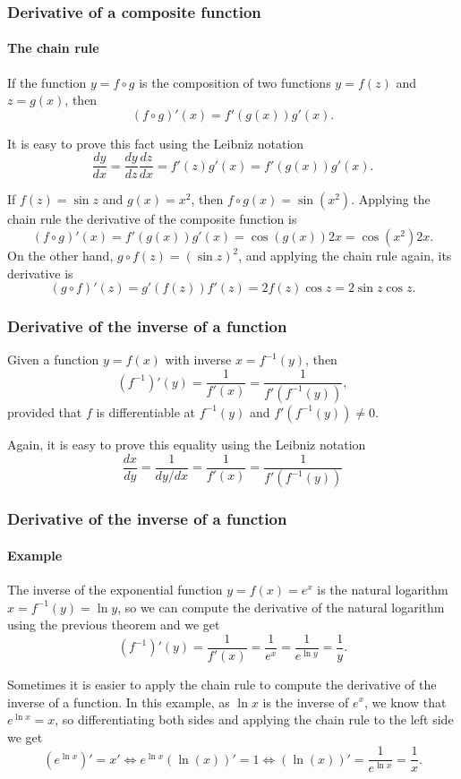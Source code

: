 \begin{frame}
\frametitle{Derivative of a composite function}
\framesubtitle{The chain rule}
\begin{theorem} If the function $y=f\circ g$ is the composition of two functions $y=f(z)$ and $z=g(x)$, then
\[ 
(f\circ g)'(x)=f'(g(x))g'(x).
\]
\end{theorem}

It is easy to prove this fact using the Leibniz notation
\[
\frac{dy}{dx}=\frac{dy}{dz}\frac{dz}{dx}=f'(z)g'(x)=f'(g(x))g'(x).
\]

 If $f(z)=\sin z$ and $g(x)=x^2$, then $f\circ g(x)=\sin(x^2)$. Applying the chain rule the derivative of the composite function is
\[
(f\circ g)'(x)=f'(g(x))g'(x) = \cos(g(x)) 2x = \cos(x^2)2x.
\]
On the other hand, $g\circ f(z)= (\sin z)^2$, and applying the chain rule again, its derivative is
\[
(g\circ f)'(z)=g'(f(z))f'(z) = 2f(z)\cos z = 2\sin z\cos z.
\]
\end{frame}


\begin{frame}
\frametitle{Derivative of the inverse of a function}
\begin{theorem}
Given a function $y=f(x)$ with inverse $x=f^{-1}(y)$, then 
\[
\left(f^{-1}\right)'(y)=\frac{1}{f'(x)}=\frac{1}{f'(f^{-1}(y))},
\]
provided that $f$ is differentiable at $f^{-1}(y)$ and $f'(f^{-1}(y))\neq 0$.
\end{theorem}

Again, it is easy to prove this equality using the Leibniz notation
\[
\frac{dx}{dy}=\frac{1}{dy/dx}=\frac{1}{f'(x)}=\frac{1}{f'(f^{-1}(y))}
\]
\end{frame}


\begin{frame}
\frametitle{Derivative of the inverse of a function}
\framesubtitle{Example}
The inverse of the exponential function $y=f(x)=e^x$ is the natural logarithm $x=f^{-1}(y)=\ln y$, so we can compute the derivative of the natural logarithm using the previous theorem and we get
\[
\left(f^{-1}\right)'(y)=\frac{1}{f'(x)}=\frac{1}{e^x}=\frac{1}{e^{\ln y}}=\frac{1}{y}.
\]

 Sometimes it is easier to apply the chain rule to compute the derivative of the inverse of a function. 
In this example, as $\ln x$ is the inverse of $e^x$, we know that $e^{\ln x}=x$, so differentiating both sides and applying the chain rule to the left side we get
\[
(e^{\ln x})'=x' \Leftrightarrow e^{\ln x}(\ln(x))' = 1 \Leftrightarrow (\ln(x))'=\frac{1}{e^{\ln x}}=\frac{1}{x}.
\]
\end{frame}



